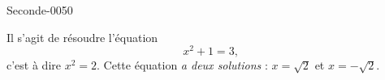
\begin{corrige}{Seconde-0050}

    Il s'agit de résoudre l'équation
    \begin{equation}
        x^2+1=3,
    \end{equation}
    c'est à dire \( x^2=2\). Cette équation \emph{a deux solutions} : \( x=\sqrt{2}\) et \( x=-\sqrt{2}\).

\end{corrige}
